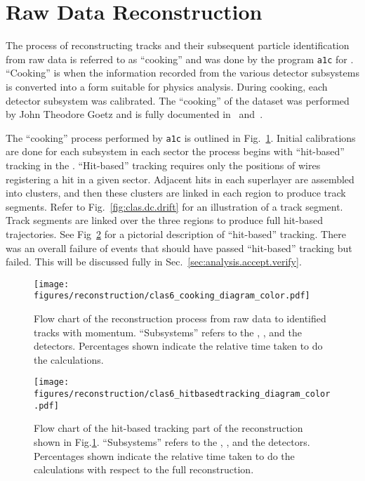 \section{Raw Data Reconstruction}\label{sec:data.cook}

The process of reconstructing tracks and their subsequent particle identification from raw data is referred to as ``cooking'' and was done by the program \texttt{a1c}\label{abbr:a1c} for . ``Cooking'' is when the information recorded from the various detector subsystems is converted into a form suitable for physics analysis. During cooking, each detector subsystem was calibrated. The ``cooking'' of the  dataset was performed by John Theodore Goetz and is fully documented in~\cite{clas.g12.note} and~\cite{goetz}.

The ``cooking'' process performed by \texttt{a1c} is outlined in Fig.~\ref{fig:data.cook.flowchart}. Initial calibrations are done for each subsystem in each sector the process begins with ``hit-based'' tracking in the . ``Hit-based'' tracking requires only the positions of wires registering a hit in a given sector. Adjacent hits in each superlayer are assembled into clusters, and then these clusters are linked in each region to produce track segments. Refer to Fig.~\ref{fig:clas.dc.drift} for an illustration of a track segment. Track segments are linked over the three regions to produce full hit-based trajectories. See Fig~\ref{fig:data.cook.flowchart.hitbased} for a pictorial description of ``hit-based'' tracking. There was an overall failure of events that should have passed ``hit-based'' tracking but failed. This will be discussed fully in Sec.~\ref{sec:analysis.accept.verify}.

\begin{figure}\begin{center}
\texttt{[image: \\figures/reconstruction/clas6\_cooking\_diagram\_color.pdf]}
\caption[Flow chart of the reconstruction process from raw data to identified tracks with momentum]{\label{fig:data.cook.flowchart}Flow chart of the reconstruction process from raw data to identified tracks with momentum. ``Subsystems'' refers to the , ,  and the  detectors. Percentages shown indicate the relative time taken to do the calculations.}
\end{center}\end{figure}

\begin{figure}\begin{center}
\texttt{[image: \\figures/reconstruction/clas6\_hitbasedtracking\_diagram\_color.pdf]}
\caption[Flow chart of the hit-based tracking part of the reconstruction]{\label{fig:data.cook.flowchart.hitbased}Flow chart of the hit-based tracking part of the reconstruction shown in Fig.\ref{fig:data.cook.flowchart}. ``Subsystems'' refers to the , ,  and the  detectors. Percentages shown indicate the relative time taken to do the calculations with respect to the full reconstruction.}
\end{center}\end{figure}


